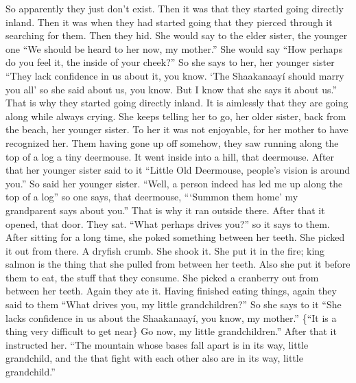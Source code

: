 \begin{pairs}
\begin{Rightside}
So apparently they just don’t exist.
Then it was that they started going directly inland.
Then it was when they had started going that they pierced through it searching for them.
Then they hid.
She would say to the elder sister, the younger one
\qqk{}“We should be heard to her now, my mother.”
She would say
“How perhaps do you feel it, the inside of your cheek?”
So she says to her, her younger sister
\qqk{}“They lack confidence in us about it, you know.
\qqk{}‘The Shaakanaayí should marry you all’
so she said about us, you know.
But I know that she says it about us.”
\pend
\pstart
{}That is why they started going directly inland.
It is aimlessly that they are going along while always crying.
She keeps telling her to go, her older sister, back from the beach, her younger sister.
To her it was not enjoyable, for her mother to have recognized her.
Them having gone up off somehow, they saw running along the top of a log a tiny deermouse.
It went inside into a hill, that deermouse.
After that her younger sister said to it
\qqk{}“Little Old Deermouse, people’s vision is around you.”
So said her younger sister.
\qqk{}“Well, a person indeed has led me up along the top of a log”
so one says, that deermouse,
\qqk{}“‘Summon them home’ my grandparent says about you.”
That is why it ran outside there.
After that it opened, that door.
They sat.
\qqk{}“What perhaps drives you?”
so it says to them.
After sitting for a long time, she poked something between her teeth.
She picked it out from there.
A dryfish crumb.
She shook it.
She put it in the fire;
king salmon is the thing that she pulled from between her teeth.
Also she put it before them to eat, the stuff that they consume.
She picked a cranberry out from between her teeth.
Again they ate it.
Having finished eating things, again they said to them
\qqk{}“What drives you, my little grandchildren?”
So she says to it
\qqk{}“She lacks confidence in us about the Shaakanaayí, you know, my mother.”
\{“It is a thing very difficult to get near\}
Go now, my little grandchildren.”
After that it instructed her.
\qqk{}“The mountain whose bases fall apart is in its way, little grandchild,
and the  that fight with each other also are in its way, little grandchild.”

\end{Rightside}
\end{pairs}
